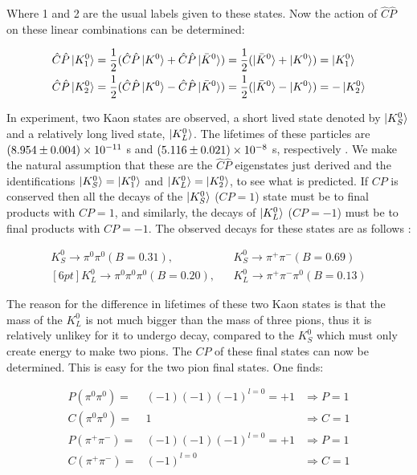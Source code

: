 \noindent Where 1 and 2 are the usual labels given to these states. Now the action of $\hat{C}\hat{P}$ on these linear combinations can be determined:

\smallskip

\begin{align*}
\hat{C}\hat{P} \ket{K^{0}_{1}} & = \frac{1}{2} (\hat{C}\hat{P} \ket{K^{0}} + \hat{C}\hat{P} \ket{\bar{K}^{0}}) = \frac{1}{2} (\ket{\bar{K}^{0}} + \ket{K^{0}}) = \ket{K^{0}_{1}} \\
\hat{C}\hat{P} \ket{K^{0}_{2}} & = \frac{1}{2} (\hat{C}\hat{P} \ket{K^{0}} - \hat{C}\hat{P} \ket{\bar{K}^{0}}) =   \frac{1}{2} (\ket{\bar{K}^{0}} - \ket{K^{0}}) = - \ket{K^{0}_{2}} \\
\end{align*} 

In experiment, two Kaon states are observed, a short lived state denoted by $\ket{K^{0}_{S}}$ and a relatively long lived state, $\ket{K^{0}_{L}}$. The lifetimes of these particles are $(8.954 \pm 0.004) \times 10^{-11}$ s and $(5.116 \pm 0.021) \times 10^{-8}$ s, respectively \cite{PDGKaons}. We make the natural assumption that these are the $\hat{C}\hat{P}$ eigenstates just derived and the identifications $\ket{K^{0}_{S}} = \ket{K^{0}_{1}}$ and $\ket{K^{0}_{L}} = \ket{K^{0}_{2}}$, to see what is predicted. If $CP$ is conserved then all the decays of the $\ket{K^{0}_{S}}$ ($CP = 1$) state must be to final products with $CP = 1$, and similarly, the decays of $\ket{K^{0}_{L}}$ ($CP = -1$) must be to final products with $CP = -1$. The observed decays for these states are as follows \cite[pg. 292]{Martin+Shaw}:

\begin{eqnarray*}    
K^{0}_S \rightarrow \pi^0 \pi^0 (B = 0.31),  &   &   K^{0}_{S} \rightarrow \pi^{+} \pi^{-} (B = 0.69)\\ [6pt]
K^{0}_L \rightarrow \pi^0 \pi^0 \pi^0 (B = 0.20),   &   &   K^{0}_{L} \rightarrow \pi^{+}  \pi^{-} \pi^0 (B =0.13)  
\end{eqnarray*}    

\noindent The reason for the difference in lifetimes of these two Kaon states is that the mass of the $K^{0}_L$ is not much bigger than the mass of three pions, thus it is relatively unlikey for it to undergo decay, compared to the $K^{0}_S$ which must only create energy to make two pions. The $CP$ of these final states can now be determined. This is easy for the two pion final states. One finds:

\begin{align}
{P} ({\pi^0 \pi^0})   = & (-1)(-1)(-1)^{l=0} = +1 & \Rightarrow P = 1  \\
{C} ({\pi^0 \pi^0})   = & 1                       & \Rightarrow C = 1  \\
{P} ({\pi^+ \pi^-})   = & (-1)(-1)(-1)^{l=0} = +1 & \Rightarrow P = 1  \\
\label{TwoPionFinalStateCalc}
{C} ({\pi^+ \pi^-})   = & (-1)^{l=0}             & \Rightarrow C = 1 
\end{align}


